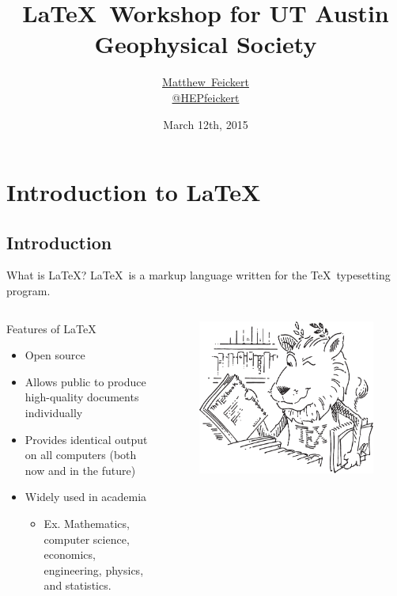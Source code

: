 \documentclass[]{beamer}
\title[\LaTeX~Workshop for UT Austin GPS] 
{%
\LaTeX~Workshop for UT Austin\\ Geophysical Society%
}
\author[Matthew Feickert]			%
{
  \textcolor{blue!50!black}{\href{http://www.matthewfeickert.com/}{Matthew~Feickert}}\inst{1}\\ \vspace{0.25cm}\href{https://twitter.com/HEPfeickert}{@HEPfeickert}
}
\institute[SMU Physics]
{
  \inst{1}%
  \href{http://www.physics.smu.edu/web/}{Southern Methodist University}
}
\date[March 12th, 2015]
{March 12th, 2015}
\begin{document}
\begin{frame}
  \titlepage
\end{frame}

\section{Introduction to \LaTeX}

\subsection*{Introduction}

\begin{frame}{What is \LaTeX?}
\LaTeX~is a markup language written for the \TeX~typesetting program.
\begin{columns}[c]
\column{2.50in}
  \begin{block}{Features of \LaTeX}
    \begin{itemize}
    			\item Open source
    			\item Allows public to produce high-quality documents individually
			\item Provides identical output on all computers (both now and in the future)
			\item Widely used in academia
				\begin{itemize}
					\item Ex. Mathematics, computer science, economics, engineering, physics, and statistics.
				\end{itemize}
    \end{itemize}
  \end{block}
\column{1.50in}
\begin{figure}[h!]
\centering
\includegraphics[scale=0.35]{CTAN_Lion.pdf}

\end{figure}
\end{columns}
\end{frame}
\end{document}
